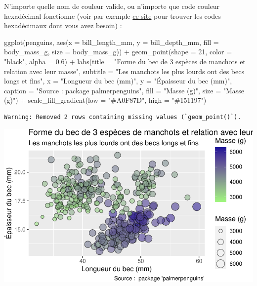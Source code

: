 \documentclass[
  a4paper,
  DIV=11,
  numbers=noendperiod,
  oneside]{scrreprt}
\newenvironment{Shaded}{}{}
\newcommand{\AttributeTok}[1]{\textcolor[rgb]{0.84,0.23,0.29}{#1}}
\newcommand{\DecValTok}[1]{\textcolor[rgb]{0.00,0.36,0.77}{#1}}
\newcommand{\FloatTok}[1]{\textcolor[rgb]{0.00,0.36,0.77}{#1}}
\newcommand{\FunctionTok}[1]{\textcolor[rgb]{0.44,0.26,0.76}{#1}}
\newcommand{\NormalTok}[1]{\textcolor[rgb]{0.14,0.16,0.18}{#1}}
\newcommand{\SpecialCharTok}[1]{\textcolor[rgb]{0.00,0.36,0.77}{#1}}
\newcommand{\StringTok}[1]{\textcolor[rgb]{0.01,0.18,0.38}{#1}}
\begin{document}
N'importe quelle nom de couleur valide, ou n'importe que code couleur
hexadécimal fonctionne (voir par exemple \href{}{ce site} pour trouver
les codes hexadécimaux dont vous avez besoin) :

\begin{Shaded}
\begin{Highlighting}[]
\FunctionTok{ggplot}\NormalTok{(penguins, }\FunctionTok{aes}\NormalTok{(}\AttributeTok{x =}\NormalTok{ bill\_length\_mm, }\AttributeTok{y =}\NormalTok{ bill\_depth\_mm,}
                     \AttributeTok{fill =}\NormalTok{ body\_mass\_g, }\AttributeTok{size =}\NormalTok{ body\_mass\_g)) }\SpecialCharTok{+}
  \FunctionTok{geom\_point}\NormalTok{(}\AttributeTok{shape =} \DecValTok{21}\NormalTok{, }\AttributeTok{color =} \StringTok{"black"}\NormalTok{, }\AttributeTok{alpha =} \FloatTok{0.6}\NormalTok{) }\SpecialCharTok{+}
  \FunctionTok{labs}\NormalTok{(}\AttributeTok{title =} \StringTok{"Forme du bec de 3 espèces de manchots et relation avec leur masse"}\NormalTok{,}
       \AttributeTok{subtitle =} \StringTok{"Les manchots les plus lourds ont des becs longs et fins"}\NormalTok{,}
       \AttributeTok{x =} \StringTok{"Longueur du bec (mm)"}\NormalTok{,}
       \AttributeTok{y =} \StringTok{"Épaisseur du bec (mm)"}\NormalTok{,}
       \AttributeTok{caption =} \StringTok{"Source :  package \textquotesingle{}palmerpenguins\textquotesingle{}"}\NormalTok{,}
       \AttributeTok{fill =} \StringTok{"Masse (g)"}\NormalTok{,}
       \AttributeTok{size =} \StringTok{"Masse (g)"}\NormalTok{) }\SpecialCharTok{+}
  \FunctionTok{scale\_fill\_gradient}\NormalTok{(}\AttributeTok{low =} \StringTok{"\#A0F87D"}\NormalTok{, }\AttributeTok{high =} \StringTok{"\#151197"}\NormalTok{)}
\end{Highlighting}
\end{Shaded}

\begin{verbatim}
Warning: Removed 2 rows containing missing values (`geom_point()`).
\end{verbatim}

\includegraphics{03-visualization_files/figure-pdf/unnamed-chunk-96-1.pdf}
\end{document}
